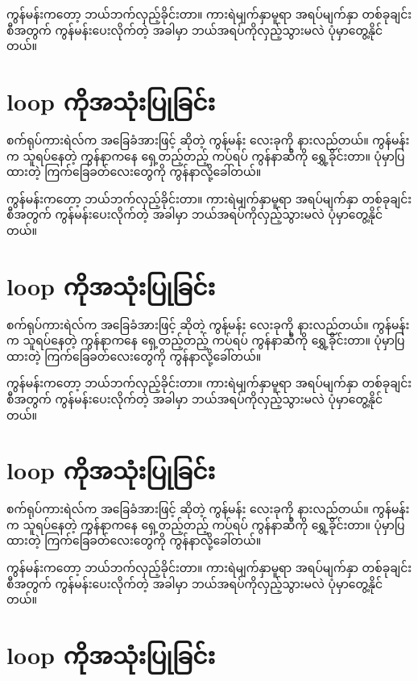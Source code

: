 \begin{sloppypar}
 ကွန်မန်းကတော့ ဘယ်ဘက်လှည့်ခိုင်းတာ။ ကားရဲမျက်နှာမူရာ အရပ်မျက်နှာ တစ်ခုချင်းစီအတွက်  ကွန်မန်းပေးလိုက်တဲ့ အခါမှာ ဘယ်အရပ်ကိုလှည့်သွားမလဲ ပုံမှာတွေ့နိုင်တယ်။
\section{{} loop ကိုအသုံးပြုခြင်း}

စက်ရုပ်ကားရဲလ်က အခြေခံအားဖြင့်  ဆိုတဲ့ ကွန်မန်း လေးခုကို နားလည်တယ်။  ကွန်မန်းက သူရပ်နေတဲ့ ကွန်နာကနေ ရှေ့တည့်တည့် ကပ်ရပ် ကွန်နာဆီကို ရွှေ့ခိုင်းတာ။ ပုံမှာပြထားတဲ့ ကြက်ခြေခတ်လေးတွေကို ကွန်နာလို့ခေါ်တယ်။ 

 ကွန်မန်းကတော့ ဘယ်ဘက်လှည့်ခိုင်းတာ။ ကားရဲမျက်နှာမူရာ အရပ်မျက်နှာ တစ်ခုချင်းစီအတွက်  ကွန်မန်းပေးလိုက်တဲ့ အခါမှာ ဘယ်အရပ်ကိုလှည့်သွားမလဲ ပုံမှာတွေ့နိုင်တယ်။
\section{{} loop ကိုအသုံးပြုခြင်း}

စက်ရုပ်ကားရဲလ်က အခြေခံအားဖြင့်  ဆိုတဲ့ ကွန်မန်း လေးခုကို နားလည်တယ်။  ကွန်မန်းက သူရပ်နေတဲ့ ကွန်နာကနေ ရှေ့တည့်တည့် ကပ်ရပ် ကွန်နာဆီကို ရွှေ့ခိုင်းတာ။ ပုံမှာပြထားတဲ့ ကြက်ခြေခတ်လေးတွေကို ကွန်နာလို့ခေါ်တယ်။ 

 ကွန်မန်းကတော့ ဘယ်ဘက်လှည့်ခိုင်းတာ။ ကားရဲမျက်နှာမူရာ အရပ်မျက်နှာ တစ်ခုချင်းစီအတွက်  ကွန်မန်းပေးလိုက်တဲ့ အခါမှာ ဘယ်အရပ်ကိုလှည့်သွားမလဲ ပုံမှာတွေ့နိုင်တယ်။
\section{{} loop ကိုအသုံးပြုခြင်း}

စက်ရုပ်ကားရဲလ်က အခြေခံအားဖြင့်  ဆိုတဲ့ ကွန်မန်း လေးခုကို နားလည်တယ်။  ကွန်မန်းက သူရပ်နေတဲ့ ကွန်နာကနေ ရှေ့တည့်တည့် ကပ်ရပ် ကွန်နာဆီကို ရွှေ့ခိုင်းတာ။ ပုံမှာပြထားတဲ့ ကြက်ခြေခတ်လေးတွေကို ကွန်နာလို့ခေါ်တယ်။ 

 ကွန်မန်းကတော့ ဘယ်ဘက်လှည့်ခိုင်းတာ။ ကားရဲမျက်နှာမူရာ အရပ်မျက်နှာ တစ်ခုချင်းစီအတွက်  ကွန်မန်းပေးလိုက်တဲ့ အခါမှာ ဘယ်အရပ်ကိုလှည့်သွားမလဲ ပုံမှာတွေ့နိုင်တယ်။
\section{{} loop ကိုအသုံးပြုခြင်း}


\end{sloppypar}

